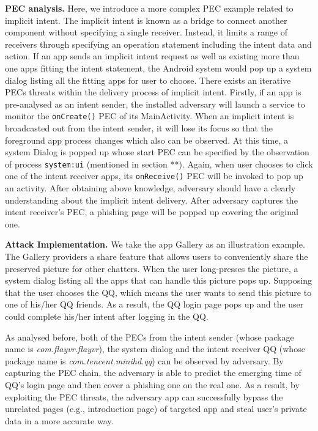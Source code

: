 \textbf{PEC analysis.} Here, we introduce a more complex PEC example related to implicit intent. The implicit intent is known as a bridge to connect another component without specifying a single receiver. Instead, it limits a range of receivers through specifying an operation statement including the intent data and action. If an app sends an implicit intent request as well as existing more than one apps fitting the intent statement, the Android system would pop up a system dialog listing all the fitting apps for user to choose. There exists an iterative PECs threats within the delivery process of implicit intent. Firstly, if an app is pre-analysed as an intent sender, the installed adversary will launch a service to monitor the \texttt{onCreate()} PEC of its MainActivity. When an implicit intent is broadcasted out from the intent sender, it will lose its focus so that the foreground app process changes which also can be observed. At this time, a system Dialog is popped up whose start PEC can be specified by the observation of process \texttt{system:ui} (mentioned in section **). Again, when user chooses to click one of the intent receiver apps, its \texttt{onReceive()} PEC will be invoked to pop up an activity. After obtaining above knowledge, adversary should have a clearly understanding about the implicit intent delivery. After adversary captures the intent receiver's PEC, a phishing page will be popped up covering the original one.


\textbf{Attack Implementation.}
We take the app Gallery as an illustration example. The Gallery providers a share feature that allows users to conveniently share the preserved picture for other chatters. When the user long-presses the picture, a system dialog listing all the apps that can handle this picture pops up. Supposing that the user chooses the QQ, which means the user wants to send this picture to one of his/her QQ friends. As a result, the QQ login page pops up and the user could complete his/her intent after logging in the QQ.

As analysed before, both of the PECs from the intent sender (whose package name is \textit{com.flayvr.flayvr}), the system dialog and the  intent receiver QQ (whose package name is \textit{com.tencent.minihd.qq}) can be observed by adversary. By capturing the PEC chain, the adversary is able to predict the emerging time of QQ's login page and then cover a phishing one on the real one. As a result, by exploiting the PEC threats, the adversary app can successfully bypass the unrelated pages (e.g., introduction page) of  targeted app and steal user's private data in a more accurate way.

